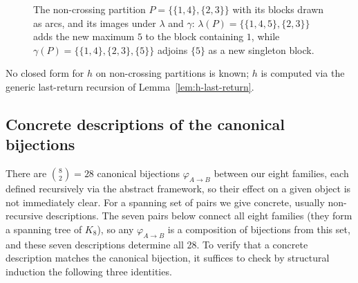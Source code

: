 \documentclass[a4paper,11pt]{article}
\theoremstyle{definition}
\begin{document}
\begin{figure}[ht]
\centering
{}
\caption{The non-crossing partition
$P = \{\{1,4\},\{2,3\}\}$ with its blocks drawn as arcs,
and its images under $\lambda$ and $\gamma$:
$\lambda(P) = \{\{1,4,5\},\{2,3\}\}$ adds the new
maximum $5$ to the block containing $1$, while
$\gamma(P) = \{\{1,4\},\{2,3\},\{5\}\}$ adjoins $\{5\}$ as a new
singleton block.}
\label{fig:ncp-ops}
\end{figure}

No closed form for $h$ on non-crossing partitions is
known; $h$ is computed via the generic last-return
recursion of Lemma~\ref{lem:h-last-return}.

\subsection{Concrete descriptions of the canonical
  bijections}\label{sec:bijections}

There are $\binom{8}{2} = 28$ canonical bijections
$\varphi_{A \to B}$ between our eight families, each
defined recursively via the abstract framework, so their
effect on a given object is not immediately clear.
For a spanning set of pairs we give concrete, usually
non-recursive descriptions. The seven pairs below connect
all eight families (they form a spanning tree of $K_8$),
so any $\varphi_{A \to B}$ is a composition of bijections
from this set, and these seven descriptions determine all
28. To verify that a concrete description matches the
canonical bijection, it suffices to check
by structural induction the following three identities.
\end{document}
